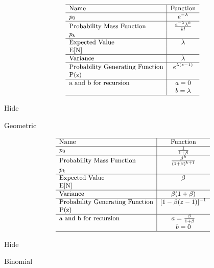 \documentclass[]{book}
\begin{document}
\[
{\small
\begin{matrix}
\begin{array}{l|c}
\hline
  \text{Name} & \text{Function} \\
\hline
  p_0 & e^{-\lambda} \\
\hline
  \text{Probability Mass Function} & \frac{e^{-\lambda}\lambda^k}{k!} \\
  p_k & \\
\hline
  \text{Expected Value} & \lambda \\
  \mathrm{E[N]} & \\
\hline
  \text{Variance} & \lambda \\
\hline
  \text{Probability Generating Function} & e^{\lambda(z-1)} \\
  \mathrm{P(z)} & \\
  \hline
  \text{a and b for recursion} & a=0 \\
   & b=\lambda \\
\hline
\end{array}
\end{matrix}
}
\]

\hypertarget{disB}{}
{Hide}

Geometric

\[
{\small
\begin{matrix}
\begin{array}{l|c}
\hline
  \text{Name} & \text{Function} \\
\hline
  p_0 & \frac{1}{1+\beta} \\
\hline
  \text{Probability Mass Function} & \frac{\beta^k}{(1+\beta)^{k+1}} \\
  p_k & \\
\hline
  \text{Expected Value} & \beta \\
  \mathrm{E[N]} & \\
\hline
  \text{Variance} & \beta(1+\beta) \\
\hline
  \text{Probability Generating Function} & [1-\beta(z-1)]^{-1} \\
  \mathrm{P(z)} & \\
  \hline
  \text{a and b for recursion} & a=\frac{\beta}{1+\beta} \\
   & b=0 \\
\hline
\end{array}
\end{matrix}
}
\]

\hypertarget{disC}{}
{Hide}

Binomial
\end{document}
